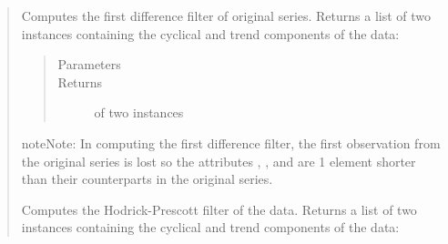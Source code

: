 \documentclass[letterpaper,10pt,openany,oneside,english]{sphinxmanual}
\begin{document}
\begin{fulllineitems}
\begin{quote}
\begin{fulllineitems}
\label{\detokenize{series_class:fredpy.series.firstdiff}}
Computes the first difference filter of original series. Returns a list of two {\hyperref[\detokenize{series_class:fredpy.series}]{}} instances containing the cyclical and trend components of the data:
\begin{quote}

\end{quote}
\begin{quote}\begin{description}
\item[{Parameters}] \leavevmode
\item[{Returns}] \leavevmode
{} of two {\hyperref[\detokenize{series_class:fredpy.series}]{}} instances

\end{description}\end{quote}

\begin{sphinxadmonition}{note}{Note:}
In computing the first difference filter, the first observation from the original series is lost so the attributes , , and  are 1 element shorter than their counterparts in the original series.
\end{sphinxadmonition}

\end{fulllineitems}


\begin{fulllineitems}
\label{\detokenize{series_class:fredpy.series.hpfilter}}
Computes the Hodrick-Prescott filter of the data. Returns a list of two {\hyperref[\detokenize{series_class:fredpy.series}]{}} instances containing the cyclical and trend components of the data:
\begin{quote}


\end{quote}
\end{fulllineitems}
\end{quote}
\end{fulllineitems}
\end{document}
